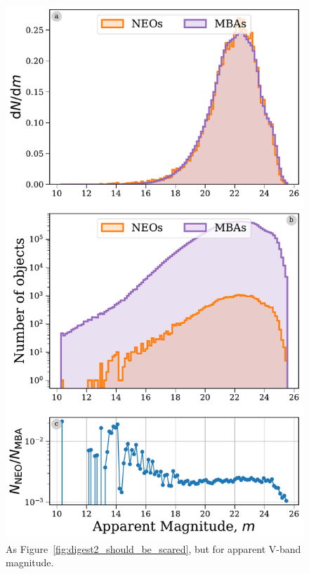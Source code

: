 \documentclass[twocolumn, twocolappendix]{aastex631}
\begin{document}
\begin{figure}[htb]
    \centering
    \includegraphics[width=\columnwidth]{figures/apparent_mag_dist_all.pdf}
    \caption{As Figure~\ref{fig:digest2_should_be_scared}, but for apparent V-band magnitude.}
    \label{fig:app_mag_all}
\end{figure}
\end{document}
